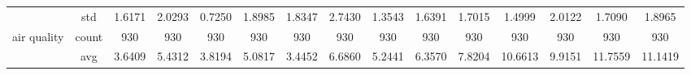 \begin{table}[H]
{\begin{tabular}{rcccc|c|c|c|c|c|ccccc}
			                                                                               & std                                    & 1.6171                                                                             & 2.0293                                                                    & 0.7250                                                                    & 1.8985                                         & 1.8347                                                                    & 2.7430                                       & 1.3543                                      & 1.6391                                         & 1.7015                                         & 1.4999                                          & 2.0122                                          & 1.7090                                         & 1.8965                                         \\
			air quality                                                                    & count                                  & 930                                                                                & 930                                                                       & 930                                                                       & 930                                            & 930                                                                       & 930                                          & 930                                         & 930                                            & 930                                            & 930                                             & 930                                             & 930                                            & 930                                            \\
			                                                                               & avg                                    & 3.6409                                                                             & 5.4312                                                                    & 3.8194                                                                    & 5.0817                                         & \cellcolor[rgb]{ .776,  .937,  .808}\textcolor[rgb]{ 0,  .38,  0}{3.4452} & 6.6860                                       & 5.2441                                      & 6.3570                                         & 7.8204                                         & 10.6613                                         & 9.9151                                          & 11.7559                                        & 11.1419                                        \\

\end{tabular}}
\end{table}
